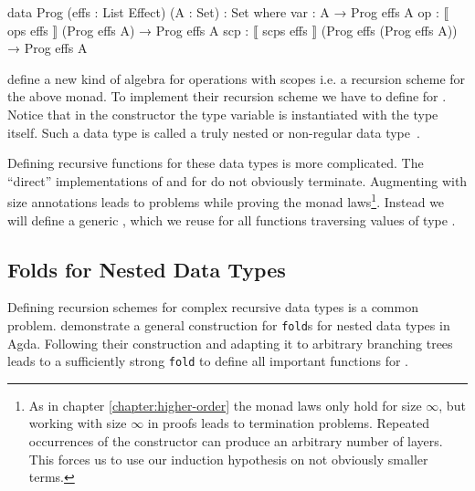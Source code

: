 \begin{code}
data Prog (effs : List Effect) (A : Set) : Set where
  var  :  A                                          → Prog effs A
  op   :  ⟦ ops   effs  ⟧ (Prog effs A)              → Prog effs A
  scp  :  ⟦ scps  effs  ⟧ (Prog effs (Prog effs A))  → Prog effs A
\end{code}
\textcite{DBLP:conf/lics/PirogSWJ18} define a new kind of algebra for operations
with scopes i.e. a recursion scheme for the above monad.
To implement their recursion scheme we have to define \AgdaFunction{>>=} for 
\AgdaSpace{}\AgdaSpace{}.
Notice that in the  constructor the type variable
 is instantiated with the type 
\AgdaSpace{}\AgdaSpace{}
itself.
Such a data type is called a truly nested or non-regular data
type~\cite{DBLP:conf/mpc/BirdM98}.

Defining recursive functions for these data types is more complicated.
The ``direct'' implementations of \AgdaFunction{<\$>} and \AgdaFunction{>>=} for
\AgdaSpace{}\AgdaSpace{}
do not obviously terminate.
Augmenting
\AgdaSpace{}\AgdaSpace{}
with size annotations leads to problems while
proving the monad laws\footnote{As in chapter \ref{chapter:higher-order} the
  monad laws only hold for size $\infty$, but working with size $\infty$ in
  proofs leads to termination problems.
  Repeated occurrences of the  constructor can
  produce an arbitrary number of
  \AgdaSpace{} layers.
  This forces us to use our induction hypothesis on not obviously smaller
  terms.}.
Instead we will define a generic , which we reuse for all
functions traversing values of type
\AgdaSpace{}\AgdaSpace{}.


\subsection{Folds for Nested Data Types}
\label{scoped-algebra:fold}

Defining recursion schemes for complex recursive data types is a common problem.
\textcite{DBLP:journals/corr/abs-1806-05230} demonstrate a general construction
for \texttt{fold}s for nested data types in Agda.
Following their construction and adapting it to arbitrary branching trees leads
to a sufficiently strong \texttt{fold} to define all important functions for
\AgdaSpace{}\AgdaSpace{}.

